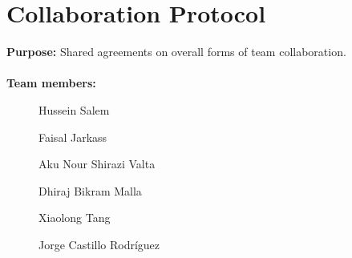 \renewcommand{\headrulewidth}{0.1pt}
\renewcommand{\footrulewidth}{0.1pt}

\section*{Collaboration Protocol}


\textbf{Purpose:} Shared agreements on overall forms of team collaboration.
\\
\\
\noindent
\textbf{Team members:}
\begin{description}
\item[] Hussein Salem
\item[] Faisal Jarkass
\item[] Aku Nour Shirazi Valta
\item[] Dhiraj Bikram Malla
\item[] Xiaolong Tang
\item[] Jorge Castillo Rodríguez
\end{description}
\\
\\
\noindent
